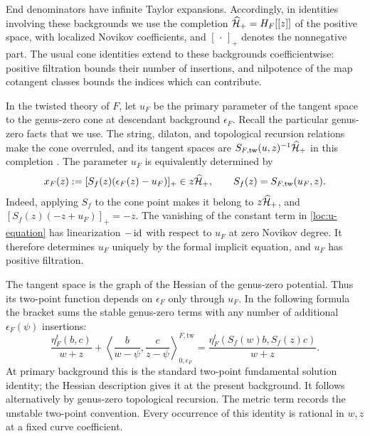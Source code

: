End denominators have infinite Taylor expansions. Accordingly, in
identities involving these backgrounds we use the completion
$\widehat{\mathcal H}_+=H_F[[z]]$ of the positive space, with localized
Novikov coefficients, and $[\,\cdot\,]_+$ denotes the nonnegative
part. The usual cone identities extend to these backgrounds
coefficientwise: positive filtration bounds their number of insertions,
and nilpotence of the map cotangent classes bounds the indices which
can contribute.

In the twisted theory of $F$, let $u_F$ be the primary parameter
of the tangent space to the genus-zero cone at descendant background
$\epsilon_F$. Recall the particular genus-zero facts that we use.
The string, dilaton, and topological recursion relations make the cone
overruled, and its tangent spaces are
$S_{F,\mathrm{tw}}(u,z)^{-1}\widehat{\mathcal H}_+$ in this completion
\cite{GiventalCone}. The parameter $u_F$ is equivalently determined by
\begin{equation}\label{loc:u-equation}
 x_F(z):=[S_f(z)(\epsilon_F(z)-u_F)]_+\in z\widehat{\mathcal H}_+,
 \qquad S_f(z)=S_{F,\mathrm{tw}}(u_F,z).
\end{equation}
Indeed, applying $S_f$ to the cone point makes it belong to
$z\widehat{\mathcal H}_+$, and $[S_f(z)(-z+u_F)]_+=-z$.
The vanishing of the constant term in \eqref{loc:u-equation} has
linearization $-\operatorname{id}$ with respect to $u_F$ at zero Novikov degree.
It therefore determines $u_F$ uniquely by the formal implicit
equation, and $u_F$ has positive filtration.

The tangent space is the graph of the Hessian of the genus-zero
potential. Thus its two-point function depends on $\epsilon_F$ only
through $u_F$. In the following formula the bracket sums the stable
genus-zero terms with any number of additional $\epsilon_F(\psi)$
insertions:
\begin{equation}\label{loc:two-point}
 \frac{\eta_F^t(b,c)}{w+z}
 +\left\langle\frac b{w-\psi},\frac c{z-\psi}
                  \right\rangle_{0,\epsilon_F}^{F,\mathrm{tw}}
 =\frac{\eta_F^t(S_f(w)b,S_f(z)c)}{w+z}.
\end{equation}
At primary background this is the standard two-point fundamental
solution identity; the Hessian description gives it at the present
background. It follows alternatively by genus-zero topological
recursion. The metric term records the unstable two-point convention.
Every occurrence of this identity is rational in $w,z$ at a fixed
curve coefficient.

